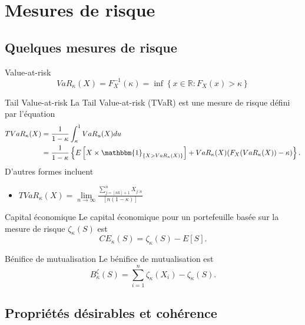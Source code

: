 \chapter{Mesures de risque}

\section{Quelques mesures de risque}

\begin{definition}{Value-at-risk}{}
	$$VaR_\kappa (X) = F^{-1}_X(\kappa) = \inf \left\{x\in \mathbb{R} : F_X(x) > \kappa \right\}$$
\end{definition}

\begin{definition}{Tail Value-at-risk}{}
	La Tail Value-at-risk (TVaR) est une mesure de risque défini par l'équation
	\begin{align*}
		TVaR_\kappa (X) & = \frac{1}{1 - \kappa} \int_{\kappa}^{1} VaR_u(X)du                                                                           \\
		                & = \frac{1}{1 - \kappa} \left\{E\left[X \times \mathbbm{1}_{\{X > VaR_\kappa(X)\}}\right] + VaR_\kappa(X)(F_X(VaR_\kappa(X)) - \kappa)\right\}.
	\end{align*}
	D'autres formes incluent
	\begin{itemize}
		\item $\displaystyle TVaR_\kappa(X) = \lim\limits_{n\to\infty}\frac{\sum_{j = [nk]+ 1}^{n}X_{j:n}}{[n(1-\kappa)]}$
	\end{itemize}
	
\end{definition}

\begin{definition}{Capital économique}{}
	Le capital économique pour un portefeuille basée sur la mesure de risque $\zeta_\kappa(S)$ est 
	$$CE_\kappa(S) = \zeta_\kappa(S) - E[S].$$
\end{definition}

\begin{definition}{Bénifice de mutualisation}{}
	Le bénifice de mutualisation est 
	$$B_\kappa^\zeta(S) = \sum_{i = 1}^{n}\zeta_\kappa(X_i) - \zeta_\kappa(S).$$
\end{definition}

\section{Propriétés désirables et cohérence}

